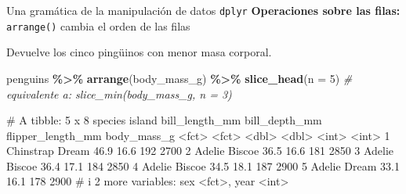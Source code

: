 \documentclass[
  ignorenonframetext,
  aspectratio=169]{beamer}
\newenvironment{Shaded}{\begin{snugshade}}{\end{snugshade}}
\newcommand{\AttributeTok}[1]{\textcolor[rgb]{0.13,0.29,0.53}{#1}}
\newcommand{\CommentTok}[1]{\textcolor[rgb]{0.56,0.35,0.01}{\textit{#1}}}
\newcommand{\DecValTok}[1]{\textcolor[rgb]{0.00,0.00,0.81}{#1}}
\newcommand{\FunctionTok}[1]{\textcolor[rgb]{0.13,0.29,0.53}{\textbf{#1}}}
\newcommand{\NormalTok}[1]{#1}
\newcommand{\SpecialCharTok}[1]{\textcolor[rgb]{0.81,0.36,0.00}{\textbf{#1}}}
\let\oldverbatim\verbatim
\let\endoldverbatim\endverbatim
\renewenvironment{verbatim}{\tiny\oldverbatim}{\endoldverbatim}
\begin{document}
\begin{frame}[fragile]{Una gramática de la manipulación de datos
\texttt{dplyr}}
\label{una-gramuxe1tica-de-la-manipulaciuxf3n-de-datos-dplyr-4}
\textbf{Operaciones sobre las filas:} \texttt{arrange()} cambia el orden
de las filas

Devuelve los cinco pingüinos con menor masa corporal.

\begin{Shaded}
\begin{Highlighting}[]
\NormalTok{penguins }\SpecialCharTok{\%\textgreater{}\%} 
  \FunctionTok{arrange}\NormalTok{(body\_mass\_g) }\SpecialCharTok{\%\textgreater{}\%} 
  \FunctionTok{slice\_head}\NormalTok{(}\AttributeTok{n =} \DecValTok{5}\NormalTok{) }\CommentTok{\# equivalente a: slice\_min(body\_mass\_g, n = 3)}
\end{Highlighting}
\end{Shaded}

\begin{verbatim}
# A tibble: 5 x 8
  species   island bill_length_mm bill_depth_mm flipper_length_mm body_mass_g
  <fct>     <fct>           <dbl>         <dbl>             <int>       <int>
1 Chinstrap Dream            46.9          16.6               192        2700
2 Adelie    Biscoe           36.5          16.6               181        2850
3 Adelie    Biscoe           36.4          17.1               184        2850
4 Adelie    Biscoe           34.5          18.1               187        2900
5 Adelie    Dream            33.1          16.1               178        2900
# i 2 more variables: sex <fct>, year <int>
\end{verbatim}
\end{frame}
\end{document}
